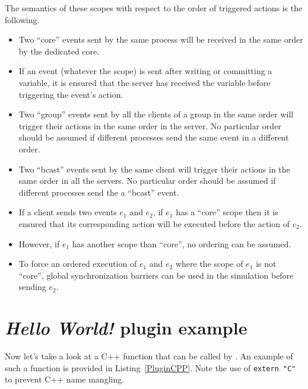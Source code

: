 \noindent\begin{minipage}{\textwidth}
\vspace{0.5cm}

\end{minipage}

The semantics of these scopes with respect to the order of triggered actions is the following.
\begin{itemize}
\item Two ``core'' events sent by the same process will be received in the same order by the dedicated core.
\item If an event (whatever the scope) is sent after writing or committing a variable, it is ensured that the
server has received the variable before triggering the event's action.
\item Two ``group'' events sent by all the clients of a group in the same order will trigger their actions in
the same order in the server. No particular order should be assumed if different processes send the
same event in a different order.
\item Two ``bcast'' events sent by the same client will trigger their actions
in the same order in all the servers. No particular order should be assumed if different processes send
the a ``bcast'' event.
\item If a client sends two events $e_1$ and $e_2$, if $e_1$ has a ``core'' scope 
then it is ensured that its corresponding action will be executed before the action of 
$e_2$. 
\item However, if $e_1$ has another scope than ``core'', no ordering can be assumed.
\item To force an ordered execution of $e_1$ and $e_2$ where the scope of $e_1$ is not ``core'',
global synchronization barriers can be used in the simulation before sending $e_2$.
\end{itemize}

\section{\emph{Hello World!} plugin example}

Now let's take a look at a C++ function that can be called by \Damaris. An example of such a function
is provided in Listing~\ref{PluginCPP}. Note the use of \texttt{extern "C"} to prevent C++ name mangling.

